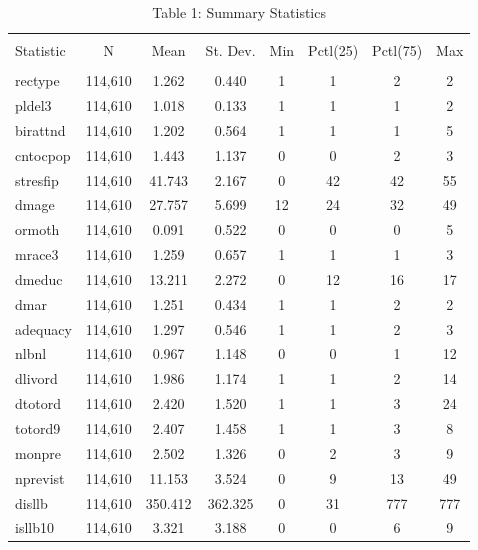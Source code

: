 
\begin{table}[!htbp] \centering 
  \caption{Table 1: Summary Statistics} 
  \label{} 
\begin{tabular}{@{\extracolsep{5pt}}lccccccc} 
\\[-1.8ex]\hline 
\hline \\[-1.8ex] 
Statistic & \multicolumn{1}{c}{N} & \multicolumn{1}{c}{Mean} & \multicolumn{1}{c}{St. Dev.} & \multicolumn{1}{c}{Min} & \multicolumn{1}{c}{Pctl(25)} & \multicolumn{1}{c}{Pctl(75)} & \multicolumn{1}{c}{Max} \\ 
\hline \\[-1.8ex] 
rectype & 114,610 & 1.262 & 0.440 & 1 & 1 & 2 & 2 \\ 
pldel3 & 114,610 & 1.018 & 0.133 & 1 & 1 & 1 & 2 \\ 
birattnd & 114,610 & 1.202 & 0.564 & 1 & 1 & 1 & 5 \\ 
cntocpop & 114,610 & 1.443 & 1.137 & 0 & 0 & 2 & 3 \\ 
stresfip & 114,610 & 41.743 & 2.167 & 0 & 42 & 42 & 55 \\ 
dmage & 114,610 & 27.757 & 5.699 & 12 & 24 & 32 & 49 \\ 
ormoth & 114,610 & 0.091 & 0.522 & 0 & 0 & 0 & 5 \\ 
mrace3 & 114,610 & 1.259 & 0.657 & 1 & 1 & 1 & 3 \\ 
dmeduc & 114,610 & 13.211 & 2.272 & 0 & 12 & 16 & 17 \\ 
dmar & 114,610 & 1.251 & 0.434 & 1 & 1 & 2 & 2 \\ 
adequacy & 114,610 & 1.297 & 0.546 & 1 & 1 & 2 & 3 \\ 
nlbnl & 114,610 & 0.967 & 1.148 & 0 & 0 & 1 & 12 \\ 
dlivord & 114,610 & 1.986 & 1.174 & 1 & 1 & 2 & 14 \\ 
dtotord & 114,610 & 2.420 & 1.520 & 1 & 1 & 3 & 24 \\ 
totord9 & 114,610 & 2.407 & 1.458 & 1 & 1 & 3 & 8 \\ 
monpre & 114,610 & 2.502 & 1.326 & 0 & 2 & 3 & 9 \\ 
nprevist & 114,610 & 11.153 & 3.524 & 0 & 9 & 13 & 49 \\ 
disllb & 114,610 & 350.412 & 362.325 & 0 & 31 & 777 & 777 \\ 
isllb10 & 114,610 & 3.321 & 3.188 & 0 & 0 & 6 & 9 \\ 

\end{tabular}
\end{table}
